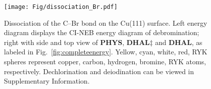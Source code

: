 \documentclass[%
 reprint,
 amsmath,amssymb,
 aps,
prb,
floatfix,
]{revtex4-2}
\newcommand{\sinfo}{Supplementary Information}
\begin{document}
\begin{figure}[hbt]
\centering
\texttt{[image: Fig/dissociation\_Br.pdf]}
\caption{Dissociation of the C--Br bond on the Cu(111) surface. Left energy diagram displays the CI-NEB energy diagram of debromination; right with side and top view of \textbf{PHYS}, \textbf{DHAL$\ddagger$} and \textbf{DHAL}, as labeled in Fig.~\ref{fig:completeenergy}. Yellow, cyan, white, red, RYK spheres represent copper, carbon, hydrogen, bromine, RYK atoms, respectively. Dechlorination and deiodination can be viewed in \sinfo.
}
\label{fig:dissociation_Br}
\end{figure}
\end{document}
